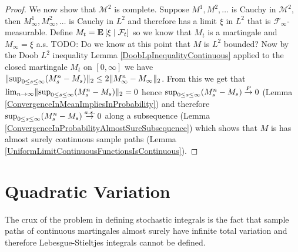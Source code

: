 \begin{proof}
We now show that $\mathcal{M}^2$ is complete.  Suppose $M^1, M^2, \dotsc$ is Cauchy in $\mathcal{M}^2$, then $M^1_\infty, M^2_\infty, \dotsc$ is Cauchy in $L^2$ and therefore has a limit $\xi$ in $L^2$ that is $\mathcal{F}_\infty$-measurable.  Define $M_t = \textbf{E}\left[ \xi \mid \mathcal{F}_t \right]$ so we know that $M_t$ is a martingale and $M_\infty = \xi$ a.s.  TODO: Do we know at this point that $M$ is $L^2$ bounded?  Now by the Doob $L^2$ inequality Lemma \ref{DoobLpInequalityContinuous} applied to the closed martingale $M_t$ on $[0,\infty]$ we have $\lVert \sup_{0 \leq s \leq \infty} (M_s^n - M_s) \rVert_2 \leq 2 \lVert M^n_\infty - M_\infty \rVert_2$.  From this we get that $\lim_{n \to \infty} \lVert \sup_{0 \leq s \leq \infty} (M_s^n - M_s) \rVert_2 = 0$ hence $\sup_{0 \leq s \leq \infty} (M_s^n - M_s) \overset{P}\to 0$ (Lemma \ref{ConvergenceInMeanImpliesInProbability}) and therefore $\sup_{0 \leq s \leq \infty} (M_s^n - M_s) \overset{a.s.}\to 0$ along a subsequence (Lemma \ref{ConvergenceInProbabilityAlmostSureSubsequence}) which shows that $M$ is has almost surely continuous sample paths (Lemma \ref{UniformLimitContinuousFunctionsIsContinuous}).
\end{proof}

\section{Quadratic Variation}
The crux of the problem in defining stochastic integrals is the fact that sample paths of continuous martingales almost surely have infinite total variation and therefore Lebesgue-Stieltjes integrals cannot be defined.   


